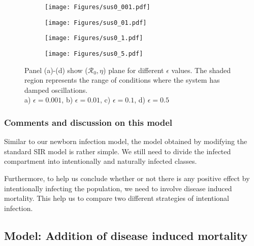 \documentclass[12pt]{article}
\newcommand{\R}{\mathcal{R}}
\begin{document}
\begin{figure}[h]
\centering

\begin{subfigure}[t]{.4\textwidth}
\centering
\texttt{[image: Figures/sus0\_001.pdf]}
        \caption{}\label{fig:fig_aa}
\end{subfigure}
%
\begin{subfigure}[t]{.4\textwidth}
\centering
\texttt{[image: Figures/sus0\_01.pdf]}
\caption{}\label{fig:fig_bb}
\end{subfigure}

\medskip

\begin{subfigure}[t]{.4\textwidth}
\centering
\vspace{0pt}%
\texttt{[image: Figures/sus0\_1.pdf]}
\caption{}\label{fig:fig_cc}
\end{subfigure}
%
\begin{subfigure}[t]{.4\textwidth}
\centering
\vspace{0pt}%
\texttt{[image: Figures/sus0\_5.pdf]}
\caption{}\label{fig:fig_dd}
\end{subfigure}
%
\begin{minipage}[t]{0.9\textwidth}
\caption{Panel (a)-(d) show ($\R_0,\eta$) plane for different $\epsilon$ values. The shaded region represents the range of conditions where the system has damped oscillations.\\
a) $\epsilon=0.001$, b) $\epsilon=0.01$, c) $\epsilon=0.1$, d) $\epsilon=0.5$}
\end{minipage}
\end{figure}

\subsubsection{Comments and discussion on this model}
Similar to our newborn infection model, the model obtained by modifying the standard SIR model is rather simple. We still need to divide the infected compartment into intentionally and naturally infected classes.

Furthermore, to help us conclude whether or not there is any positive effect by intentionally infecting the population, we need to involve disease induced mortality. This help us to compare two different strategies of intentional infection.

\subsection{Model: Addition of disease induced mortality}
\end{document}
